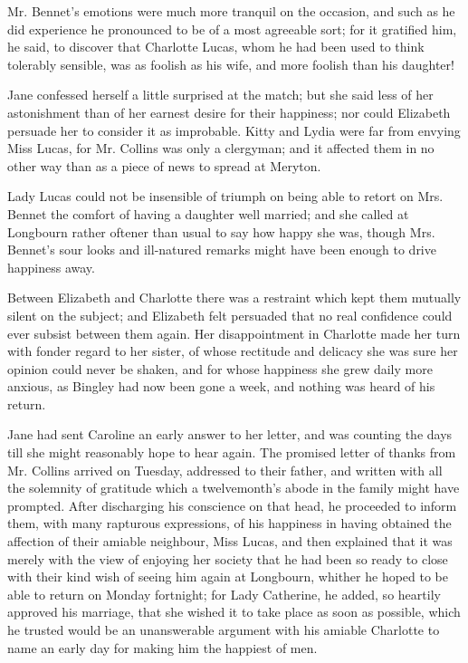 Mr. Bennet’s emotions were much more tranquil on the
occasion, and such as he did experience he pronounced
to be of a most agreeable sort; for it gratified him, he
said, to discover that Charlotte Lucas, whom he had been
used to think tolerably sensible, was as foolish as his wife,
and more foolish than his daughter!

Jane confessed herself a little surprised at the match;
but she said less of her astonishment than of her earnest
desire for their happiness; nor could Elizabeth persuade
her to consider it as improbable. Kitty and Lydia were
far from envying Miss Lucas, for Mr. Collins was only
a clergyman; and it affected them in no other way than
as a piece of news to spread at Meryton.

Lady Lucas could not be insensible of triumph on being
able to retort on Mrs. Bennet the comfort of having a
daughter well married; and she called at Longbourn
rather oftener than usual to say how happy she was,
though Mrs. Bennet’s sour looks and ill-natured remarks
might have been enough to drive happiness away.

Between Elizabeth and Charlotte there was a restraint
which kept them mutually silent on the subject; and
Elizabeth felt persuaded that no real confidence could
ever subsist between them again. Her disappointment
in Charlotte made her turn with fonder regard to her
sister, of whose rectitude and delicacy she was sure her
opinion could never be shaken, and for whose happiness
she grew daily more anxious, as Bingley had now been
gone a week, and nothing was heard of his return.

Jane had sent Caroline an early answer to her letter,
and was counting the days till she might reasonably hope
to hear again. The promised letter of thanks from
Mr. Collins arrived on Tuesday, addressed to their father,
and written with all the solemnity of gratitude which a
twelvemonth’s abode in the family might have prompted.
After discharging his conscience on that head, he proceeded
to inform them, with many rapturous expressions,
of his happiness in having obtained the affection of their
amiable neighbour, Miss Lucas, and then explained that
it was merely with the view of enjoying her society that
he had been so ready to close with their kind wish of
seeing him again at Longbourn, whither he hoped to be
able to return on Monday fortnight; for Lady Catherine,
he added, so heartily approved his marriage, that she
wished it to take place as soon as possible, which he trusted
would be an unanswerable argument with his amiable
Charlotte to name an early day for making him the happiest
of men.

